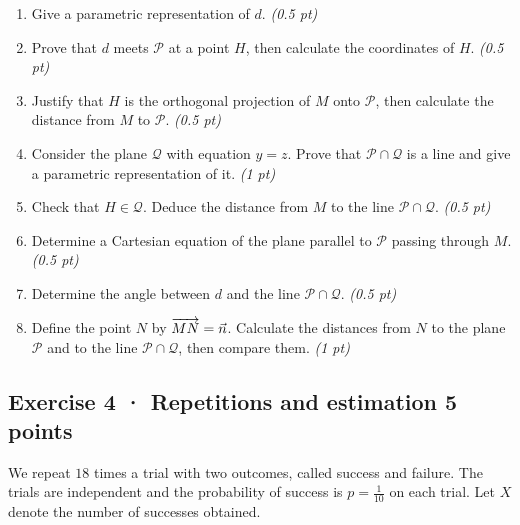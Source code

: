 \begin{enumerate}

\item Give a parametric representation of $d$. \hfill\textit{(0.5 pt)}

\item Prove that $d$ meets $\mathcal P$ at a point $H$, then calculate the coordinates of $H$. \hfill\textit{(0.5 pt)}

\item Justify that $H$ is the orthogonal projection of $M$ onto $\mathcal P$, then calculate the distance from $M$ to $\mathcal P$. \hfill\textit{(0.5 pt)}

\item Consider the plane $\mathcal Q$ with equation $y=z$. Prove that $\mathcal P\cap\mathcal Q$ is a line and give a parametric representation of it. \hfill\textit{(1 pt)}

\item Check that $H\in\mathcal Q$. Deduce the distance from $M$ to the line $\mathcal P\cap\mathcal Q$. \hfill\textit{(0.5 pt)}

\item Determine a Cartesian equation of the plane parallel to $\mathcal P$ passing through $M$. \hfill\textit{(0.5 pt)}

\item Determine the angle between $d$ and the line $\mathcal P\cap\mathcal Q$. \hfill\textit{(0.5 pt)}

\item Define the point $N$ by $\overrightarrow{MN}=\vec n$. Calculate the distances from $N$ to the plane $\mathcal P$ and to the line $\mathcal P\cap\mathcal Q$, then compare them. \hfill\textit{(1 pt)}

\end{enumerate}

\subsection*{Exercise 4 · Repetitions and estimation \hfill 5 points}We repeat $18$ times a trial with two outcomes, called success and failure. The trials are independent and the probability of success is $p=\frac{1}{10}$ on each trial. Let $X$ denote the number of successes obtained.

